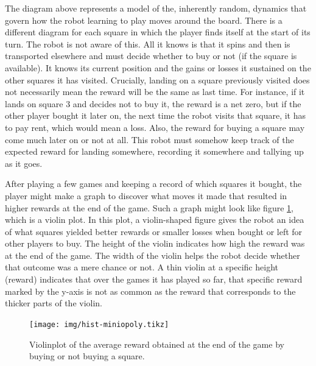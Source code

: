 The diagram above represents a model of the, inherently random, dynamics that
govern how the robot learning to play moves around the board. There is a
different diagram for each square in which the player finds itself at the start
of its turn. The robot is not aware of this. All it knows is that it spins and
then is transported elsewhere and must decide whether to buy or not (if the
square is available). It knows its current position and the gains or losses it
sustained on the other squares it has visited. Crucially, landing on a square
previously visited does not necessarily mean the reward will be the same as last
time. For instance, if it lands on square 3 and decides not to buy it, the
reward is a net zero, but if the other player bought it later on, the next time
the robot visits that square, it has to pay rent, which would mean a loss. Also,
the reward for buying a square may come much later on or not at all. This robot
must somehow keep track of the expected reward for landing somewhere, recording
it somewhere and tallying up as it goes.

After playing a few games and keeping a record of which squares it bought, the
player might make a graph to discover what moves it made that resulted in higher
rewards at the end of the game. Such a graph might look like figure
\ref{fig:violinplot}, which is a violin plot. In this plot, a violin-shaped
figure gives the robot an idea of what squares yielded better rewards or smaller
losses when bought or left for other players to buy. The height of the violin
indicates how high the reward was at the end of the game. The width of the
violin helps the robot decide whether that outcome was a mere chance or not.  A
thin violin at a specific height (reward) indicates that over the games it has
played so far, that specific reward marked by the y-axis is not as common as
the reward that corresponds to the thicker parts of the violin.

\begin{figure}
\centering
\texttt{[image: img/hist-miniopoly.tikz]}
\caption{Violinplot of the average reward obtained at the end 
of the game by buying or not buying a square.}
\label{fig:violinplot}
\end{figure}

